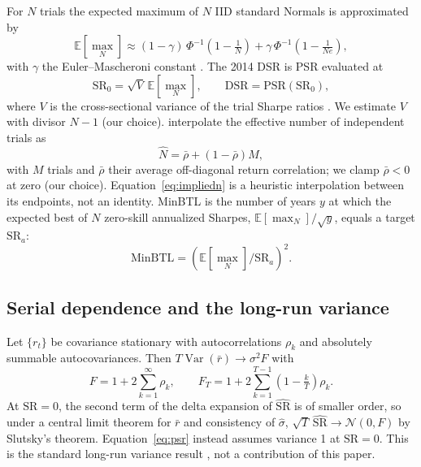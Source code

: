 \documentclass[11pt,a4paper]{article}
\newcommand{\SR}{\mathrm{SR}}
\newcommand{\hSR}{\widehat{\mathrm{SR}}}
\newcommand{\E}{\mathbb{E}}
\newcommand{\Var}{\operatorname{Var}}
\theoremstyle{remark}
\begin{document}
For $N$ trials the expected maximum of $N$ IID standard Normals is approximated by
\begin{equation}\label{eq:emax}
\E[\max_N]\approx(1-\gamma)\,\Phi^{-1}\!\left(1-\tfrac1N\right)+\gamma\,\Phi^{-1}\!\left(1-\tfrac1{Ne}\right),
\end{equation}
with $\gamma$ the Euler--Mascheroni constant \citep[Eq.~2.4, p.~9]{bailey2014pseudo}. The 2014 DSR is PSR evaluated at
\begin{equation}\label{eq:dsr}
\SR_0=\sqrt{V}\,\E[\max_N],\qquad \mathrm{DSR}=\mathrm{PSR}(\SR_0),
\end{equation}
where $V$ is the cross-sectional variance of the trial Sharpe ratios \citep[Eq.~2, p.~8]{bailey2014dsr}. We estimate $V$ with divisor $N-1$ (our choice). \citet[Eqs.~8--9, p.~14]{bailey2014dsr} interpolate the effective number of independent trials as
\begin{equation}\label{eq:impliedn}
\hat N=\bar\rho+(1-\bar\rho)M,
\end{equation}
with $M$ trials and $\bar\rho$ their average off-diagonal return correlation; we clamp $\bar\rho<0$ at zero (our choice). Equation~\eqref{eq:impliedn} is a heuristic interpolation between its endpoints, not an identity. MinBTL \citep[Eq.~3.2, p.~11]{bailey2014pseudo} is the number of years $y$ at which the expected best of $N$ zero-skill annualized Sharpes, $\E[\max_N]/\sqrt{y}$, equals a target $\SR_a$:
\begin{equation}\label{eq:minbtl}
\mathrm{MinBTL}=\left(\E[\max_N]/\SR_a\right)^2 .
\end{equation}

\subsection{Serial dependence and the long-run variance}
Let $\{r_t\}$ be covariance stationary with autocorrelations $\rho_k$ and absolutely summable autocovariances. Then $T\Var(\bar r)\to\sigma^2F$ with
\begin{equation}\label{eq:lrv}
F=1+2\sum_{k=1}^{\infty}\rho_k,\qquad F_T=1+2\sum_{k=1}^{T-1}\left(1-\tfrac{k}{T}\right)\rho_k .
\end{equation}
At $\SR=0$, the second term of the delta expansion of $\hSR$ is of smaller order, so under a central limit theorem for $\bar r$ and consistency of $\hat\sigma$, $\sqrt T\,\hSR\to\mathcal N(0,F)$ by Slutsky's theorem. Equation~\eqref{eq:psr} instead assumes variance 1 at $\SR=0$. This is the standard long-run variance result \citep[cf.][]{lo2002,newey1987}, not a contribution of this paper.
\end{document}
